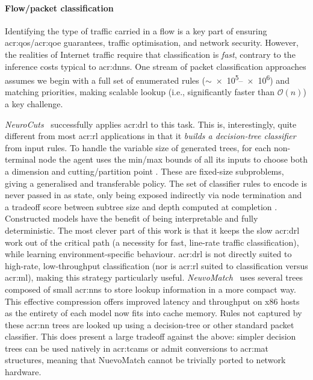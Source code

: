 \paragraph{Flow/packet classification}
Identifying the type of traffic carried in a flow is a key part of ensuring \gls{acr:qos}/\gls{acr:qoe} guarantees, traffic optimisation, and network security.
However, the realities of Internet traffic require that classification is \emph{fast}, contrary to the inference costs typical to \glspl{acr:dnn}.
One stream of packet classification approaches assumes we begin with a full set of enumerated rules ($\sim$\numrange{e5}{e6}) and matching priorities, making scalable lookup (i.e., significantly faster than $\mathcal{O}\left(n\right)$) a key challenge.

\emph{NeuroCuts}~\parencite{DBLP:conf/sigcomm/LiangZJS19} successfully applies \gls{acr:drl} to this task.
This is, interestingly, quite different from most \gls{acr:rl} applications in that it \emph{builds a decision-tree classifier} from input rules.
To handle the variable size of generated trees, for each non-terminal node the agent uses the min/max bounds of all its inputs \prllitstate{} to choose both a dimension and cutting/partition point \prllitact{}.
These are fixed-size subproblems, giving a generalised and transferable policy.
The set of classifier rules to encode is never passed in as state, only being exposed indirectly via node termination and a tradeoff score between subtree size and depth computed at completion \prllitreward.
Constructed models have the benefit of being interpretable and fully deterministic.
The most clever part of this work is that it keeps the slow \gls{acr:drl} work out of the critical path (a necessity for fast, line-rate traffic classification), while learning environment-specific behaviour.
\gls{acr:drl} is not directly suited to high-rate, low-throughput classification (nor is \gls{acr:rl} suited to classification versus \gls{acr:ml}), making this strategy particularly useful.
\emph{NeuvoMatch}~\parencite{DBLP:conf/sigcomm/RashelbachRS20} uses several trees composed of small \glspl{acr:nn} to store lookup information in a more compact way.
This effective compression offers improved latency and throughput on x86 hosts as the entirety of each model now fits into cache memory.
Rules not captured by these \gls{acr:nn} trees are looked up using a decision-tree or other standard packet classifier.
This does present a large tradeoff against the above: simpler decision trees can be used natively in \glspl{acr:tcam} or admit conversions to \gls{acr:mat} structures, meaning that NuevoMatch cannot be trivially ported to network hardware.


